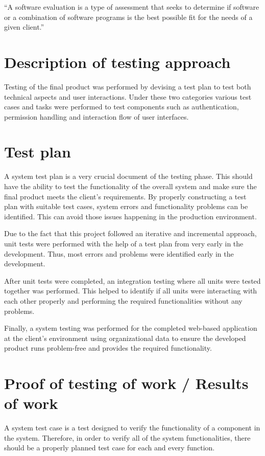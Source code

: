 \documentclass[12pt]{report}
\begin{document}
``A software evaluation is a type of assessment that seeks to determine if software or a combination of software programs is the best possible fit for the needs of a given client.''\cite{tatum_2020_software_evaluation}


\section{Description of testing approach}
Testing of the final product was performed by devising a test plan to test both technical aspects and user interactions. Under these two categories various test cases and tasks were performed to test components such as authentication, permission handling and interaction flow of user interfaces.


\section{Test plan}
A system test plan is a very crucial document of the testing phase. This should have the ability to test the functionality of the overall system and make sure the final product meets the client's requirements. By properly constructing a test plan with suitable test cases, system errors and functionality problems can be identified. This can avoid those issues happening in the production environment.

Due to the fact that this project followed an iterative and incremental approach, unit tests were performed with the help of a test plan from very early in the development. Thus, most errors and problems were identified early in the development.

After unit tests were completed, an integration testing where all units were tested together was performed. This helped to identify if all units were interacting with each other properly and performing the required functionalities without any problems.

Finally, a system testing was performed for the completed web-based application at the client's environment using organizational data to ensure the developed product runs problem-free and provides the required functionality.

\section{Proof of testing of work / Results of work}
A system test case is a test designed to verify the functionality of a component in the system. Therefore, in order to verify all of the system functionalities, there should be a properly planned test case for each and every function.
\end{document}
